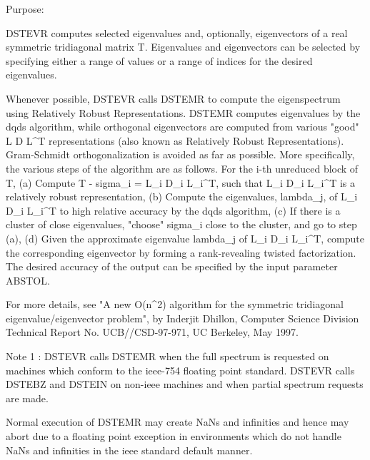  \begin{DoxyParagraph}{Purpose\+: }
\begin{DoxyVerb} DSTEVR computes selected eigenvalues and, optionally, eigenvectors
 of a real symmetric tridiagonal matrix T.  Eigenvalues and
 eigenvectors can be selected by specifying either a range of values
 or a range of indices for the desired eigenvalues.

 Whenever possible, DSTEVR calls DSTEMR to compute the
 eigenspectrum using Relatively Robust Representations.  DSTEMR
 computes eigenvalues by the dqds algorithm, while orthogonal
 eigenvectors are computed from various "good" L D L^T representations
 (also known as Relatively Robust Representations). Gram-Schmidt
 orthogonalization is avoided as far as possible. More specifically,
 the various steps of the algorithm are as follows. For the i-th
 unreduced block of T,
    (a) Compute T - sigma_i = L_i D_i L_i^T, such that L_i D_i L_i^T
         is a relatively robust representation,
    (b) Compute the eigenvalues, lambda_j, of L_i D_i L_i^T to high
        relative accuracy by the dqds algorithm,
    (c) If there is a cluster of close eigenvalues, "choose" sigma_i
        close to the cluster, and go to step (a),
    (d) Given the approximate eigenvalue lambda_j of L_i D_i L_i^T,
        compute the corresponding eigenvector by forming a
        rank-revealing twisted factorization.
 The desired accuracy of the output can be specified by the input
 parameter ABSTOL.

 For more details, see "A new O(n^2) algorithm for the symmetric
 tridiagonal eigenvalue/eigenvector problem", by Inderjit Dhillon,
 Computer Science Division Technical Report No. UCB//CSD-97-971,
 UC Berkeley, May 1997.


 Note 1 : DSTEVR calls DSTEMR when the full spectrum is requested
 on machines which conform to the ieee-754 floating point standard.
 DSTEVR calls DSTEBZ and DSTEIN on non-ieee machines and
 when partial spectrum requests are made.

 Normal execution of DSTEMR may create NaNs and infinities and
 hence may abort due to a floating point exception in environments
 which do not handle NaNs and infinities in the ieee standard default
 manner.\end{DoxyVerb}
 
\end{DoxyParagraph}

